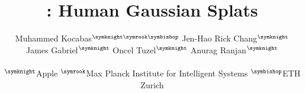 \documentclass[10pt,twocolumn,letterpaper]{article}
\begin{document}
\newcommand{\jamie}[1]{\textcolor{red}{#1}}

\title{\acronym: Human Gaussian Splats}

\author{Muhammed Kocabas$^{\symknight\symrook\symbishop}$
\;\; Jen-Hao Rick Chang$^\symknight$ \;\;  James Gabriel$^\symknight$\;\;  Oncel Tuzel$^\symknight$ \;\;  Anurag Ranjan$^\symknight$ \\ \\
$^\symknight$Apple  \;\; $^\symrook$Max Planck Institute for Intelligent Systems \;\; $^\symbishop$ETH Zurich
{}}








% 



{\small


}

\end{document}
